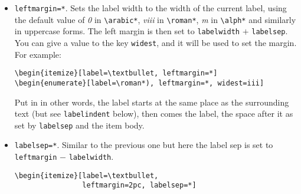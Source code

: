 \documentclass{article}
\begin{document}
\begin{itemize}
Note the \verb|label|s are \textit{not} accumulated to form
the reference. If you want, say, something like 1.\textit{a}
from 1) as first level and \textit{a}) as second level,
you must set it with \verb|ref|. You may use
\verb|\ref{level1}.\ref{level2}| with appropiate \verb|ref|
settings, but as Robin Fairbairns points out in the \TeX{} FAQ
\begin{quote}
\dots{} [that] would be both tedious and error-prone. What is more, it 
would be undesirable, since you would be constructing a visual 
representation which is inflexible (you could not change all the 
references to elements of a list at one fell swoop).
\end{quote}
This is sensible and I recommend to follow the advice, but sometimes
you might want something like:
\begin{verbatim}
... subitem \ref{level2} of item \ref{level1} ...
\end{verbatim}

Both \verb|label| and \verb|ref| are moving arguments, and fragile
commands must be protected \textit{except} the counters.

\item \verb|leftmargin=*|.  Sets the label width to the width of
the current label, using the default value of \textit{0} in
\verb|\arabic*|, \textit{viii} in \verb|\roman*|, \textit{m} in
\verb|\alph*| and similarly in uppercase forms.  The left
margin is then set to \verb|labelwidth| $+$ \verb|labelsep|.
You can give a value to the key \verb|widest|, and it will
be used to set the margin.  For example:
\begin{verbatim}
\begin{itemize}[label=\textbullet, leftmargin=*]
\begin{enumerate}[label=\roman*), leftmargin=*, widest=iii]
\end{verbatim}

Put in in other words, the label starts at the same place as the
surrounding text (but see \verb|labelindent| below), then comes the
label, the space after it as set by \verb|labelsep| and the item body.

\item \verb|labelsep=*|. Similar to the previous one
but here the label sep is set to \verb|leftmargin| $-$
\verb|labelwidth|.
\begin{verbatim}
\begin{itemize}[label=\textbullet,
                leftmargin=2pc, labelsep=*]
\end{verbatim}


\end{itemize}
\end{document}
